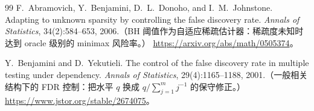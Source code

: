 \documentclass[11pt, a4paper]{ctexart}
\theoremstyle{plain}
\theoremstyle{definition}
\theoremstyle{remark}
\begin{document}
\begin{thebibliography}{99}
F.~Abramovich, Y.~Benjamini, D.~L.~Donoho, and I.~M.~Johnstone.
\newblock Adapting to unknown sparsity by controlling the false discovery rate.
\newblock \emph{Annals of Statistics}, 34(2):584--653, 2006.（BH 阈值作为自适应稀疏估计器：稀疏度未知时达到 oracle 级别的 minimax 风险率。）
\newblock \url{https://arxiv.org/abs/math/0505374}。

Y.~Benjamini and D.~Yekutieli.
\newblock The control of the false discovery rate in multiple testing under dependency.
\newblock \emph{Annals of Statistics}, 29(4):1165--1188, 2001.（一般相关结构下的 FDR 控制：把水平 $q$ 换成 $q / \sum_{j=1}^m j^{-1}$ 的保守修正。）
\newblock \url{https://www.jstor.org/stable/2674075}。

\end{thebibliography}
\end{document}
